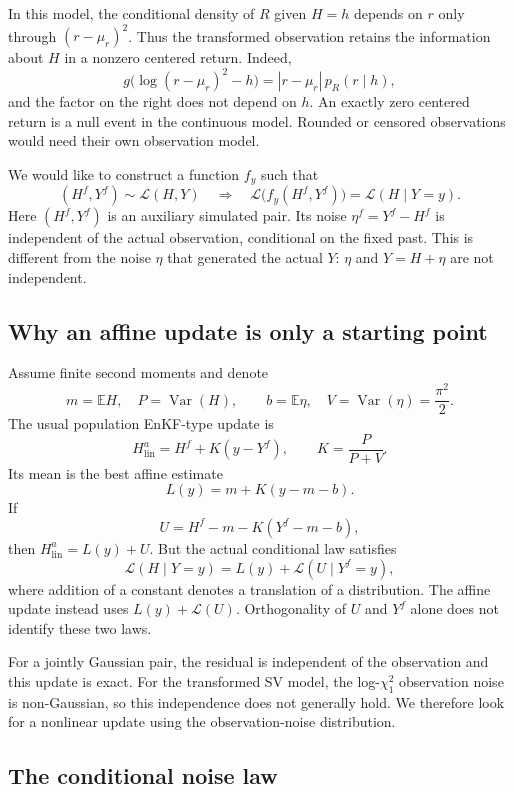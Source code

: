 In this model, the conditional density of $R$ given $H=h$ depends on
$r$ only through $(r-\mu_r)^2$. Thus the transformed observation retains
the information about $H$ in a nonzero centered return. Indeed,
\[
g\bigl(\log(r-\mu_r)^2-h\bigr)
=|r-\mu_r|\,p_R(r\mid h),
\]
and the factor on the right does not depend on $h$.
An exactly zero centered return is a null event in the continuous model.
Rounded or censored observations would need their own observation model.

We would like to construct a function $f_y$ such that
\begin{equation}
(H^f,Y^f)\sim\mathcal L(H,Y)
\quad\Longrightarrow\quad
\mathcal L\bigl(f_y(H^f,Y^f)\bigr)=\mathcal L(H\mid Y=y).
\label{eq:noise-transport:target}
\end{equation}
Here $(H^f,Y^f)$ is an auxiliary simulated pair. Its noise
$\eta^f=Y^f-H^f$ is independent of the actual observation, conditional
on the fixed past. This is different from the noise $\eta$ that
generated the actual $Y$: $\eta$ and $Y=H+\eta$ are not independent.

\subsection{Why an affine update is only a starting point}

Assume finite second moments and denote
\[
m=\mathbb E H,\quad P=\operatorname{Var}(H),\qquad
b=\mathbb E\eta,\quad V=\operatorname{Var}(\eta)=\frac{\pi^2}{2}.
\]
The usual population EnKF-type update is
\[
H^a_{\mathrm{lin}}=H^f+K(y-Y^f),\qquad K=\frac{P}{P+V}.
\]
Its mean is the best affine estimate
\[
L(y)=m+K(y-m-b).
\]
If
\[
U=H^f-m-K(Y^f-m-b),
\]
then $H^a_{\mathrm{lin}}=L(y)+U$. But the actual conditional law satisfies
\[
\mathcal L(H\mid Y=y)=L(y)+\mathcal L(U\mid Y^f=y),
\]
where addition of a constant denotes a translation of a distribution.
The affine update instead uses $L(y)+\mathcal L(U)$. Orthogonality of
$U$ and $Y^f$ alone does not identify these two laws.

For a jointly Gaussian pair, the residual is independent of the
observation and this update is exact. For the transformed SV model,
the log-$\chi_1^2$ observation noise is non-Gaussian, so this independence
does not generally hold. We therefore look for a nonlinear update
using the observation-noise distribution.

\subsection{The conditional noise law}

